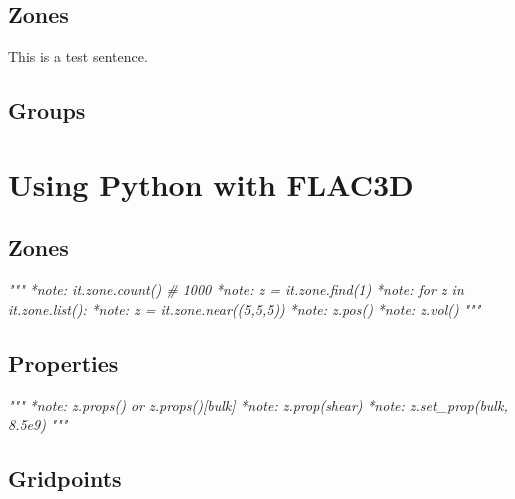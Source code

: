 \documentclass[a4paper, nobind]{templates/ociamthesis}
\newenvironment{Shaded}{\begin{snugshade}}{\end{snugshade}}
\newcommand{\CommentTok}[1]{\textcolor[rgb]{0.56,0.35,0.01}{\textit{#1}}}
\renewenvironment{Shaded}
{
  \vspace{10pt}%
  \begin{snugshade}%
}{%
  \end{snugshade}%
  \vspace{8pt}%
}
\begin{document}
\hypertarget{zones}{%
\section{Zones}\label{zones}}

This is a test sentence.

\hypertarget{groups}{%
\section{Groups}\label{groups}}

\newpage

\hypertarget{using-python-with-flac3d}{%
\chapter{Using Python with FLAC3D}\label{using-python-with-flac3d}}

\hypertarget{zones-1}{%
\section{Zones}\label{zones-1}}

\begin{Shaded}
\begin{Highlighting}[]
\CommentTok{"""}
\CommentTok{*note: it.zone.count() \# 1000}
\CommentTok{*note: z = it.zone.find(1)}
\CommentTok{*note: for z in it.zone.list():}
\CommentTok{*note: z = it.zone.near((5,5,5))}
\CommentTok{*note: z.pos()}
\CommentTok{*note: z.vol()}
\CommentTok{"""}
\end{Highlighting}
\end{Shaded}

\hypertarget{properties}{%
\section{Properties}\label{properties}}

\begin{Shaded}
\begin{Highlighting}[]
\CommentTok{"""}
\CommentTok{*note: z.props() or z.props()[\textquotesingle{}bulk\textquotesingle{}]}
\CommentTok{*note: z.prop(\textquotesingle{}shear\textquotesingle{})}
\CommentTok{*note: z.set\_prop(\textquotesingle{}bulk\textquotesingle{}, 8.5e9)}
\CommentTok{"""}
\end{Highlighting}
\end{Shaded}

\hypertarget{gridpoints}{%
\section{Gridpoints}\label{gridpoints}}
\end{document}
